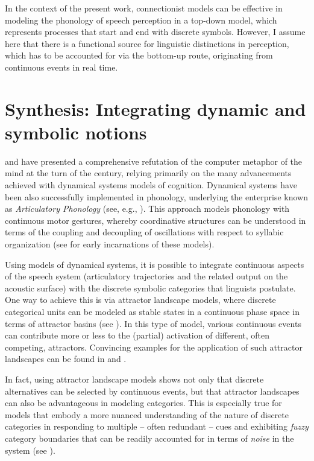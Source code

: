 In the context of the present work, connectionist models can be effective in modeling the phonology of speech perception in a top-down model, which represents processes that start and end with discrete symbols. However, I assume here that there is a functional source for linguistic distinctions in perception, which has to be accounted for via the bottom-up route, originating from continuous events in real time.

\section{Synthesis: Integrating dynamic and symbolic notions}\label{sec:synthesis}

\citet{port1995mind, kelso1997dynamic} and \citet{spivey2007continuity} have presented a comprehensive refutation of the computer metaphor of the mind at the turn of the century, relying primarily on the many advancements achieved with dynamical systems models of cognition. Dynamical systems have been also successfully implemented in phonology, underlying the enterprise known as \emph{Articulatory Phonology} (see, e.g., \citealt{browman1992articulatorysk, goldstein2009coupled, nam2009self}). This approach models phonology with continuous motor gestures, whereby
coordinative structures
can be understood in terms of the coupling and decoupling of oscillations with respect to syllabic organization (see \citealt{haken1985theoretical} for early incarnations of these models).

Using models of 
dynamical systems, 
it is possible to integrate continuous aspects of the speech system (articulatory trajectories and the related output on the acoustic surface)
with the discrete symbolic categories that linguists postulate. One way to achieve this is via attractor landscape models, where discrete categorical units can be modeled as
stable states in a continuous phase space in terms of
attractor basins (see \citealt{haken1990synergeticssk}). In this type of model, various continuous events can contribute more or less to the (partial) activation of different, often competing, attractors.
Convincing examples for the application of such attractor landscapes can be found in \citet{tuller1994nonlinear, case1995evaluation, raczaszek1999categorization, gafosbenus2006dynamics, roessig2019modeling} and \citet{roessig2019dynamics}.

In fact, using attractor landscape models shows not only that discrete alternatives can be selected by continuous events, but that attractor landscapes can also be advantageous in modeling categories. This is especially true for models that embody a more nuanced understanding of the nature of discrete categories in responding to multiple -- often redundant -- cues and exhibiting \emph{fuzzy} category boundaries that can be readily accounted for in terms of \emph{noise} in the system (see \cite[8--9]{roessig2019dynamics}).

